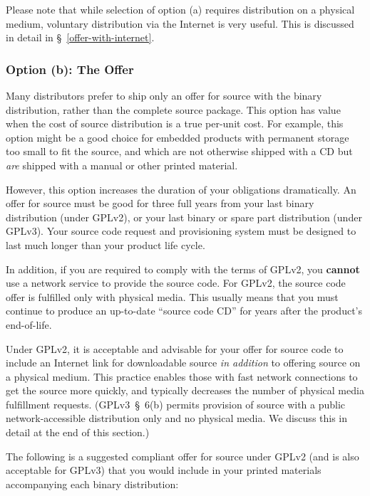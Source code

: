 \documentclass[letterpaper]{fixme}
\begin{document}
Please note that while selection of option (a) requires distribution on a
physical medium, voluntary distribution via the Internet is very useful.  This
is discussed in detail in \S~\ref{offer-with-internet}.

\subsubsection{Option (b): The Offer}
\label{offer-for-source}

Many distributors prefer to ship only an offer for source with the binary
distribution, rather than the complete source package.  This
option has value when the cost of source distribution is a true
per-unit cost.  For example, this option might be a good choice for
embedded products with permanent storage too small to fit the source, and
which are not otherwise shipped with a CD but \emph{are} shipped with a
manual or other printed material.

However, this option increases the duration of your obligations
dramatically.  An offer for source must be good for three full years from
your last binary distribution (under GPLv2), or your last binary or spare
part distribution (under GPLv3).  Your source code request and
provisioning system must be designed to last much longer than your product
life cycle.

In addition, if you are required to comply with the terms of GPLv2, you
{\bf cannot} use a network service to provide the source code.  For GPLv2,
the source code offer is fulfilled only with physical media.  This usually
means that you must continue to produce an up-to-date ``source code CD''
for years after the product's end-of-life.

\label{offer-with-internet}

Under GPLv2, it is acceptable and advisable for your offer for source code
to include an Internet link for downloadable source \emph{in addition} to
offering source on a physical medium.  This practice enables those with
fast network connections to get the source more quickly, and typically
decreases the number of physical media fulfillment requests.
(GPLv3~\S~6(b) permits provision of source with a public
network-accessible distribution only and no physical media.  We discuss
this in detail at the end of this section.)

The following is a suggested compliant offer for source under GPLv2 (and
is also acceptable for GPLv3) that you would include in your printed
materials accompanying each binary distribution:
\end{document}
